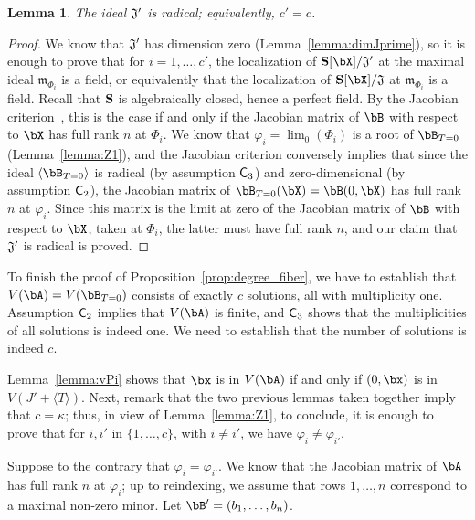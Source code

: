 \documentclass[12pt]{article}
\newtheorem{lemma}[definition]{Lemma}
\begin{document}
\begin{lemma}\label{lemma:Jprimerad}
  The ideal $\frak{J}'$ is radical; equivalently, $c'=c$.
\end{lemma}
\begin{proof}
  We know that $\frak{J}'$ has dimension zero
  (Lemma~\ref{lemma:dimJprime}), so it is enough to prove that for
  $i=1,\dots,c'$, the localization of $\SS[\bX]/\frak{J}'$ at the
  maximal ideal $\mathfrak{m}_{\Phi_i}$ is a field, or equi\-valently
  that the localization of $\SS[\bX]/\frak{J}$ at
  $\mathfrak{m}_{\Phi_i}$ is a field.  Recall that $\mathbf{S}$ is
  algebraically closed, hence a perfect field. By the Jacobian
  criterion~\cite[Theorem~16.19.b]{Eisenbud95}, this is the case if
  and only if the Jacobian matrix of $\bB$ with respect to $\bX$ has
  full rank $n$ at $\Phi_i$. We know that $\varphi_i=\lim_0(\Phi_i)$
  is a root of $\bB_{T=0}$ (Lemma~\ref{lemma:Z1}), and the Jacobian
  criterion conversely implies that since the ideal $\langle \bB_{T=0}
  \rangle$ is radical (by assumption $\mathsf{C}_3$) and zero-dimensional
  (by assumption $\mathsf{C}_2$), the Jacobian matrix of
  $\bB_{T=0}(\bX)=\bB(0,\bX)$ has full rank $n$ at $\varphi_i$. Since
  this matrix is the limit at zero of the Jacobian matrix of $\bB$
  with respect to $\bX$, taken at $\Phi_i$, the latter must have full
  rank $n$, and our claim that $\frak{J}'$ is radical is proved.
\end{proof}

To finish the proof of Proposition~\ref{prop:degree_fiber}, we have to
establish that $V(\bA)=V(\bB_{T=0})$ consists of exactly $c$ solutions, all
with multiplicity one. Assumption $\mathsf{C}_2$ implies that
$V(\bA)$ is finite, and $\mathsf{C}_3$ shows that the multiplicities
of all solutions is indeed one. We need to establish that the number of 
solutions is indeed $c$.

Lemma~\ref{lemma:vPi} shows that $\bx$ is in $V(\bA)$ if and only if
$(0,\bx)$ is in $V(J' + \langle T\rangle)$. Next, remark that the two
previous lemmas taken together imply that $c=\kappa$; thus, in view of
Lemma~\ref{lemma:Z1}, to conclude, it is enough to prove that for
$i,i'$ in $\{1,\dots,c\}$, with $i \ne i'$, we have $\varphi_i \ne
\varphi_{i'}$.

Suppose to the contrary that $\varphi_i = \varphi_{i'}$. We know that
the Jacobian matrix of $\bA$ has full rank $n$ at $\varphi_i$; up to
reindexing, we assume that rows $1,\dots,n$ correspond to a maximal
non-zero minor. Let $\bB'=(b_1,\dots,b_n)$.
\end{document}
